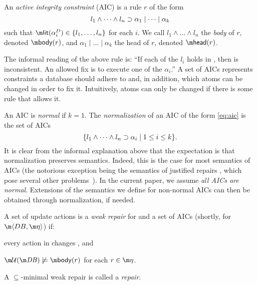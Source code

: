 \begin{definition}
 An \emph{active integrity constraint} (AIC) is a rule $r$ of the form
  \begin{equation} l_1\land \dots\land l_n\supset \alpha_1\mid\dots \mid \alpha_k \label{eq:aic}\end{equation}
  such that $\litof(\alpha_i^D) \in \{l_1,\dots,l_n\}$ for each $i$.
%  
  We call $l_1\land \dots \land l_n$ the \emph{body} of $r$, denoted $\body(r)$, and $\alpha_1\mid\dots \mid \alpha_k$ the head of $r$, denoted $\head (r)$.
\end{definition}

The informal reading of the above rule is: ``If each of the $l_i$ holds in \db, then \db is inconsistent. An allowed fix is to execute one of the $\alpha_i$.''
A set of AICs represents constraints a database should adhere to and, in addition, which atoms can be changed in order to fix it. Intuitively, atoms can only be changed if there is some rule that allows it. 


An AIC is \emph{normal} if $k=1$. The \emph{normalization} of an AIC of the form \eqref{eq:aic} is the set of AICs 
\[\{l_1\land \dots\land l_n\supset \alpha_i\mid 1\leq i\leq k\}.\]
It is clear from the informal explanation above that the expectation is that normalization preserves semantics. Indeed, this is the case for most semantics of AICs (the notorious exception being the semantics of justified repairs \cite{tplp/CaropreseT11}, which pose several other problems~\cite{tase/Cruz-FilipeEGN13}).
In the current paper, we assume \emph{all AICs are normal}. Extensions of the semantics we define for non-normal AICs can then be obtained through normalization, if needed.

\begin{definition}
 A set of update actions \UU is a \emph{weak repair} for \db and a set \aics of AICs (shortly, for $\fulldb$) if:
 \begin{compactitem}
  \item every action in \UU changes \db, and 
  \item $\UU(\db)\not\models \body(r)$ for each $r\in\aics$.
 \end{compactitem}
A $\subseteq$-minimal weak repair is called a \emph{repair}.
\end{definition}

